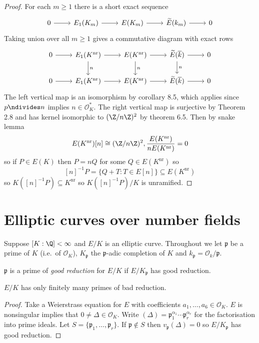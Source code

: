 \documentclass[a4paper]{article}
\theoremstyle{definition}
\renewcommand*{\O}{\mathcal{O}}
\begin{document}
\begin{proof}
  For each \(m \geq 1\) there is a short exact sequence
  \[
    \begin{tikzcd}
      0 \ar[r] & E_1(K_m) \ar[r] & E(K_m) \ar[r] & \widetilde E(k_m) \ar[r] & 0
    \end{tikzcd}
  \]
  Taking union over all \(m \geq 1\) gives a commutative diagram with exact rows
  \[
    \begin{tikzcd}
      0 \ar[r] & E_1(K^{\mathrm{nr}}) \ar[d, "n"] \ar[r] & E(K^{\mathrm{nr}}) \ar[r] \ar[d, "n"] & \widetilde E(\overline k) \ar[r] \ar[d, "n"] & 0 \\
      0 \ar[r] & E_1(K^{\mathrm{nr}}) \ar[r] & E(K^{\mathrm{nr}}) \ar[r] & \widetilde E(\overline k) \ar[r] & 0
    \end{tikzcd}
  \]
  The left vertical map is an isomorphism by corollary 8.5, which applies since \(p \ndivides n\) implies \(n \in \O_K^*\). The right vertical map is surjective by Theorem 2.8 and has kernel isomorphic to \((\Z/n\Z)^2\) by theorem 6.5. Then by snake lemma
  \[
    E(K^{\mathrm{nr}})[n] \cong (\Z/n\Z)^2, \frac{E(K^{\mathrm{nr}})}{n E(K^{\mathrm{nr}})} = 0
  \]
  so if \(P \in E(K)\) then \(P = nQ\) for some \(Q \in E(K^{\mathrm{nr}})\) so
  \[
    [n]^{-1} P = \{Q + T: T \in E[n]\} \subseteq E(K^{\mathrm{nr}})
  \]
  so \(K([n]^{-1} P) \subseteq K^{\mathrm{nr}}\) so \(K([n]^{-1}P)/K\) is unramified.
\end{proof}

\section{Elliptic curves over number fields}

Suppose \([K: \Q] < \infty\) and \(E/K\) is an elliptic curve. Throughout we let \(\mathfrak p\) be a prime of \(K\) (i.e.\ of \(\O_K\)), \(K_{\mathfrak p}\) the \(\mathfrak p\)-adic completion of \(K\) and \(k_{\mathfrak p} = \O_k/\mathfrak p\).

\begin{definition}
  \(\mathfrak p\) is a prime of \emph{good reduction} for \(E/K\) if \(E/K_{\mathfrak p}\) has good reduction.
\end{definition}

\begin{lemma}
  \(E/K\) has only finitely many primes of bad reduction.
\end{lemma}

\begin{proof}
  Take a Weierstrass equation for \(E\) with coefficients \(a_1, \dots, a_6 \in \O_K\). \(E\) is nonsingular implies that \(0 \neq \Delta \in \O_K\). Write \((\Delta) = \mathfrak p_1^{\alpha_1} \cdots \mathfrak p_r^{\alpha_r}\) for the factorisation into prime ideals. Let \(S = \{\mathfrak p_1, \dots, \mathfrak p_r\}\). If \(\mathfrak p \notin S\) then \(v_{\mathfrak p}(\Delta) = 0\) so \(E/K_{\mathfrak p}\) has good reduction.
\end{proof}
\end{document}
